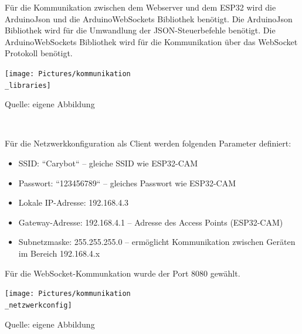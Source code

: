 \documentclass[ngerman,12pt,a4paper]{article}
\begin{document}
	Für die Kommunikation zwischen dem Webserver und dem ESP32 wird die ArduinoJson und die ArduinoWebSockets Bibliothek benötigt. Die ArduinoJson Bibliothek wird für die Umwandlung der JSON-Steuerbefehle benötigt. Die ArduinoWebSockets Bibliothek wird für die Kommunikation über das WebSocket Protokoll benötigt. \\
	\begin{center}
		\begin{minipage}[t]{0.45\textwidth}
			\texttt{[image: Pictures/kommunikation\\\_libraries]}
			\label{fig:kommunikation_libraries}
			\vspace{-10pt}
			\begin{center}
				\par\small Quelle: eigene Abbildung 
			\end{center}
		\end{minipage} \\[0.75cm]
	\end{center}
	\newpage
	Für die Netzwerkkonfiguration als Client werden folgenden Parameter definiert:
	\begin{itemize}
		\item SSID: “Carybot“ – gleiche SSID wie ESP32-CAM
		\item Passwort: “123456789“ – gleiches Passwort wie ESP32-CAM
		\item Lokale IP-Adresse: 192.168.4.3 
		\item Gateway-Adresse: 192.168.4.1 – Adresse des Access Points (ESP32-CAM)
		\item Subnetzmaske: 255.255.255.0 – ermöglicht Kommunikation zwischen Geräten im Bereich 192.168.4.x
	\end{itemize}
	Für die WebSocket-Kommunkation wurde der Port 8080 gewählt. 
	\begin{center}
		\begin{minipage}[t]{0.65\textwidth}
			\texttt{[image: Pictures/kommunikation\\\_netzwerkconfig]}
			\label{fig:kommunikation_netwerkconfig}
			\vspace{-10pt}
			\begin{center}
				\par\small Quelle: eigene Abbildung 
			\end{center}
		\end{minipage} \\[1cm]
	\end{center}
\end{document}
